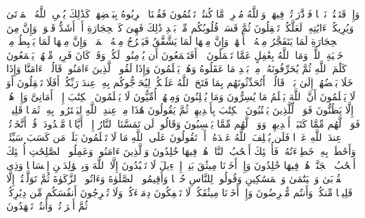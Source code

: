 \stopbuffer
\startbuffer[\q:2:72]
وَإِذۡ قَتَلۡتُمۡ نَفۡسࣰا فَٱدَّٰرَءۡتُمۡ فِیهَاۖ وَٱللَّهُ مُخۡرِجࣱ مَّا كُنتُمۡ تَكۡتُمُونَ%
\stopbuffer
\startbuffer[\q:2:73]
فَقُلۡنَا ٱضۡرِبُوهُ بِبَعۡضِهَاۚ كَذَٰلِكَ یُحۡیِ ٱللَّهُ ٱلۡمَوۡتَىٰ وَیُرِیكُمۡ ءَایَٰتِهِۦ لَعَلَّكُمۡ تَعۡقِلُونَ%
\stopbuffer
\startbuffer[\q:2:74]
ثُمَّ قَسَتۡ قُلُوبُكُم مِّنۢ بَعۡدِ ذَٰلِكَ فَهِیَ كَٱلۡحِجَارَةِ أَوۡ أَشَدُّ قَسۡوَةࣰۚ وَإِنَّ مِنَ ٱلۡحِجَارَةِ لَمَا یَتَفَجَّرُ مِنۡهُ ٱلۡأَنۡهَٰرُۚ وَإِنَّ مِنۡهَا لَمَا یَشَّقَّقُ فَیَخۡرُجُ مِنۡهُ ٱلۡمَاۤءُۚ وَإِنَّ مِنۡهَا لَمَا یَهۡبِطُ مِنۡ خَشۡیَةِ ٱللَّهِۗ وَمَا ٱللَّهُ بِغَٰفِلٍ عَمَّا تَعۡمَلُونَ%
\stopbuffer
\startbuffer[\q:2:75]
۞ أَفَتَطۡمَعُونَ أَن یُؤۡمِنُوا۟ لَكُمۡ وَقَدۡ كَانَ فَرِیقࣱ مِّنۡهُمۡ یَسۡمَعُونَ كَلَٰمَ ٱللَّهِ ثُمَّ یُحَرِّفُونَهُۥ مِنۢ بَعۡدِ مَا عَقَلُوهُ وَهُمۡ یَعۡلَمُونَ%
\stopbuffer
\startbuffer[\q:2:76]
وَإِذَا لَقُوا۟ ٱلَّذِینَ ءَامَنُوا۟ قَالُوۤا۟ ءَامَنَّا وَإِذَا خَلَا بَعۡضُهُمۡ إِلَىٰ بَعۡضࣲ قَالُوۤا۟ أَتُحَدِّثُونَهُم بِمَا فَتَحَ ٱللَّهُ عَلَیۡكُمۡ لِیُحَاۤجُّوكُم بِهِۦ عِندَ رَبِّكُمۡۚ أَفَلَا تَعۡقِلُونَ%
\stopbuffer
\startbuffer[\q:2:77]
أَوَ لَا یَعۡلَمُونَ أَنَّ ٱللَّهَ یَعۡلَمُ مَا یُسِرُّونَ وَمَا یُعۡلِنُونَ%
\stopbuffer
\startbuffer[\q:2:78]
وَمِنۡهُمۡ أُمِّیُّونَ لَا یَعۡلَمُونَ ٱلۡكِتَٰبَ إِلَّاۤ أَمَانِیَّ وَإِنۡ هُمۡ إِلَّا یَظُنُّونَ%
\stopbuffer
\startbuffer[\q:2:79]
فَوَیۡلࣱ لِّلَّذِینَ یَكۡتُبُونَ ٱلۡكِتَٰبَ بِأَیۡدِیهِمۡ ثُمَّ یَقُولُونَ هَٰذَا مِنۡ عِندِ ٱللَّهِ لِیَشۡتَرُوا۟ بِهِۦ ثَمَنࣰا قَلِیلࣰاۖ فَوَیۡلࣱ لَّهُم مِّمَّا كَتَبَتۡ أَیۡدِیهِمۡ وَوَیۡلࣱ لَّهُم مِّمَّا یَكۡسِبُونَ%
\stopbuffer
\startbuffer[\q:2:80]
وَقَالُوا۟ لَن تَمَسَّنَا ٱلنَّارُ إِلَّاۤ أَیَّامࣰا مَّعۡدُودَةࣰۚ قُلۡ أَتَّخَذۡتُمۡ عِندَ ٱللَّهِ عَهۡدࣰا فَلَن یُخۡلِفَ ٱللَّهُ عَهۡدَهُۥۤۖ أَمۡ تَقُولُونَ عَلَى ٱللَّهِ مَا لَا تَعۡلَمُونَ%
\stopbuffer
\startbuffer[\q:2:81]
بَلَىٰۚ مَن كَسَبَ سَیِّئَةࣰ وَأَحَٰطَتۡ بِهِۦ خَطِیۤءَتُهُۥ فَأُو۟لَٰۤئِكَ أَصۡحَٰبُ ٱلنَّارِۖ هُمۡ فِیهَا خَٰلِدُونَ%
\stopbuffer
\startbuffer[\q:2:82]
وَٱلَّذِینَ ءَامَنُوا۟ وَعَمِلُوا۟ ٱلصَّٰلِحَٰتِ أُو۟لَٰۤئِكَ أَصۡحَٰبُ ٱلۡجَنَّةِۖ هُمۡ فِیهَا خَٰلِدُونَ%
\stopbuffer
\startbuffer[\q:2:83]
وَإِذۡ أَخَذۡنَا مِیثَٰقَ بَنِیۤ إِسۡرَٰۤءِیلَ لَا تَعۡبُدُونَ إِلَّا ٱللَّهَ وَبِٱلۡوَٰلِدَیۡنِ إِحۡسَانࣰا وَذِی ٱلۡقُرۡبَىٰ وَٱلۡیَتَٰمَىٰ وَٱلۡمَسَٰكِینِ وَقُولُوا۟ لِلنَّاسِ حُسۡنࣰا وَأَقِیمُوا۟ ٱلصَّلَوٰةَ وَءَاتُوا۟ ٱلزَّكَوٰةَ ثُمَّ تَوَلَّیۡتُمۡ إِلَّا قَلِیلࣰا مِّنكُمۡ وَأَنتُم مُّعۡرِضُونَ%
\stopbuffer
\startbuffer[\q:2:84]
وَإِذۡ أَخَذۡنَا مِیثَٰقَكُمۡ لَا تَسۡفِكُونَ دِمَاۤءَكُمۡ وَلَا تُخۡرِجُونَ أَنفُسَكُم مِّن دِیَٰرِكُمۡ ثُمَّ أَقۡرَرۡتُمۡ وَأَنتُمۡ تَشۡهَدُونَ%
